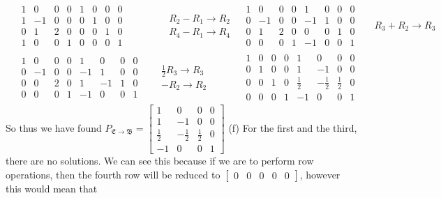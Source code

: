 \documentclass{report}
\begin{document}
\begin{align*}
	&\begin{array}{cccc|cccc}
	1 & 0 & 0 & 0 & 1 & 0 & 0 & 0 \\
	1 & -1 & 0 & 0 & 0 & 1 & 0 & 0 \\
	0 & 1 & 2 & 0 & 0 & 0 & 1 & 0 \\	
	1 & 0 & 0 & 1 & 0 & 0 & 0 & 1
	\end{array}
	&& \begin{aligned} & R_2 - R_1 \rightarrow R_2 \\ & R_4 - R_1 \rightarrow R_4 \end{aligned}
	&\begin{array}{cccc|cccc}
	1 & 0 & 0 & 0 & 1 & 0 & 0 & 0 \\
	0 & -1 & 0 & 0 & -1 & 1 & 0 & 0 \\
	0 & 1 & 2 & 0 & 0 & 0 & 1 & 0 \\	
	0 & 0 & 0 & 1 & -1 & 0 & 0 & 1
	\end{array}
	&& R_3 + R_2 \rightarrow R_3 \\
	&\begin{array}{cccc|cccc}
	1 & 0 & 0 & 0 & 1 & 0 & 0 & 0 \\
	0 & -1 & 0 & 0 & -1 & 1 & 0 & 0 \\
	0 & 0 & 2 & 0 & 1 & -1 & 1 & 0 \\	
	0 & 0 & 0 & 1 & -1 & 0 & 0 & 1
	\end{array}
	&& \begin{aligned} \frac{1}{2}R_3 \rightarrow R_3 \\ -R_2 \rightarrow R_2 \end{aligned}
	&\begin{array}{cccc|cccc}
	1 & 0 & 0 & 0 & 1 & 0 & 0 & 0 \\
	0 & 1 & 0 & 0 & 1 & -1 & 0 & 0 \\
	0 & 0 & 1 & 0 & \frac{1}{2} & -\frac{1}{2} & \frac{1}{2} & 0 \\	
	0 & 0 & 0 & 1 & -1 & 0 & 0 & 1
	\end{array}
\end{align*}
So thus we have found $P_{\mathfrak{E}\rightarrow\mathfrak{B}} =
\begin{bmatrix}
1 & 0 & 0 & 0 \\
1 & -1 & 0 & 0 \\
\frac{1}{2} & -\frac{1}{2} & \frac{1}{2} & 0 \\	
-1 & 0 & 0 & 1
\end{bmatrix}
$
(f) For the first and the third, there are no solutions. We can see this because if we are to perform row operations, then the fourth row will be reduced to $\begin{bmatrix} 0 & 0 & 0 & 0 & 0 \end{bmatrix}$, however this would mean that
\end{document}
